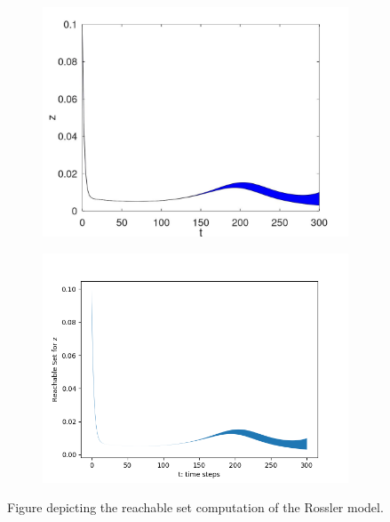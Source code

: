 \documentclass[EPiC]{easychair}
\begin{document}
\begin{figure}[h]
    \begin{subfigure}{0.47\textwidth}
    \centering
    \includegraphics[width=\textwidth]{SapoFigures/Rosslert/SapoRossler_Z.jpg}
    \end{subfigure}
    \begin{subfigure}{0.47\textwidth}
    \centering
    \includegraphics[width=1.3\textwidth]{SapoFigures/Rosslert/KaaRosslerZ.png}
    \end{subfigure}
    
    \caption{Figure depicting the reachable set computation of the Rossler model.} 
    \label{fig2}
\end{figure}    
\end{document}
